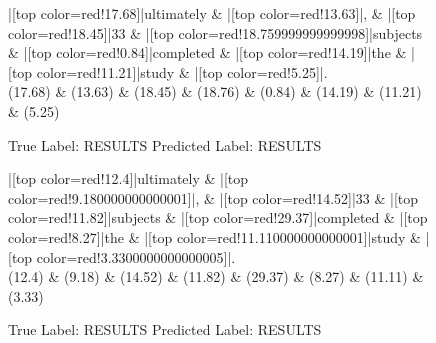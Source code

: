 \documentclass[a4paper, landscape]{article}
\begin{document}
\clearpage
\begin{figure}
\begin{center}
\begin{dependency}
\begin{deptext}
|[top color=red!17.68]|ultimately \& |[top color=red!13.63]|, \& |[top color=red!18.45]|33 \& |[top color=red!18.759999999999998]|subjects \& |[top color=red!0.84]|completed \& |[top color=red!14.19]|the \& |[top color=red!11.21]|study \& |[top color=red!5.25]|.\\
(17.68) \& (13.63) \& (18.45) \& (18.76) \& (0.84) \& (14.19) \& (11.21) \& (5.25)\\
\end{deptext}
\end{dependency}
\end{center}
\caption{True Label: RESULTS Predicted Label: RESULTS}
\end{figure}
\clearpage
\begin{figure}
\begin{center}
\begin{dependency}
\begin{deptext}
|[top color=red!12.4]|ultimately \& |[top color=red!9.180000000000001]|, \& |[top color=red!14.52]|33 \& |[top color=red!11.82]|subjects \& |[top color=red!29.37]|completed \& |[top color=red!8.27]|the \& |[top color=red!11.110000000000001]|study \& |[top color=red!3.3300000000000005]|.\\
(12.4) \& (9.18) \& (14.52) \& (11.82) \& (29.37) \& (8.27) \& (11.11) \& (3.33)\\
\end{deptext}
\end{dependency}
\end{center}
\caption{True Label: RESULTS Predicted Label: RESULTS}
\end{figure}
\clearpage
\end{document}
